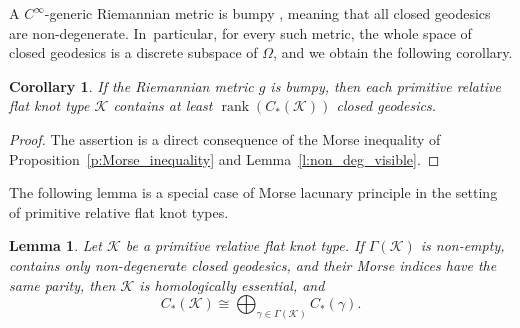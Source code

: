 \documentclass[11pt]{article}
\newcommand{\KK}{\mathcal{K}}
\DeclareMathOperator{\rank}{rank}
\theoremstyle{plain}
\newtheorem{Lemma}[Thm]{Lemma}
\newtheorem{Cor}[Thm]{Corollary}
\theoremstyle{definition}
\begin{document}
A $C^\infty$-generic Riemannian metric is bumpy \cite{Anosov:1982aa}, meaning that all closed geodesics are non-degenerate. In~particular, for every such metric, the whole space of closed geodesics is a discrete subspace of $\Omega$, and we obtain the following corollary.

\begin{Cor}
If the Riemannian metric $g$ is bumpy, then each primitive relative flat knot type $\KK$ contains at least $\rank(C_*(\KK))$ closed geodesics.
\end{Cor}

\begin{proof}
The assertion is a direct consequence of the Morse inequality of Proposition~\ref{p:Morse_inequality} and Lemma~\ref{l:non_deg_visible}.
\end{proof}

The following lemma is a special case of Morse lacunary principle in the setting of primitive relative flat knot types.

\begin{Lemma}
\label{l:local_homology_parity}
Let $\KK$ be a primitive relative flat knot type. If $\Gamma(\KK)$ is non-empty, contains only non-degenerate closed geodesics, and their Morse indices have the same parity, then $\KK$ is homologically essential, and
\[
C_*(\KK) \cong \bigoplus_{\gamma\in\Gamma(\KK)} C_*(\gamma).
\]
\end{Lemma}
\end{document}
